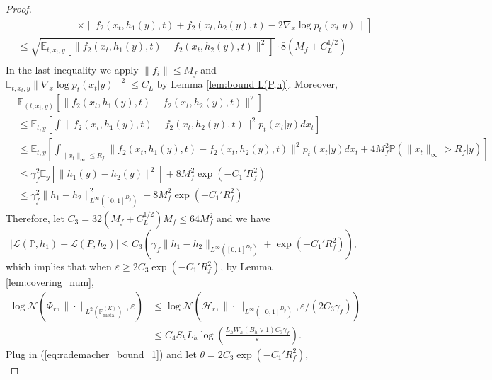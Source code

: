 \documentclass{article}
\numberwithin{equation}{section}
\def\eqref#1{equation~\ref{#1}}
\newcommand{\E}{\mathbb{E}}
\theoremstyle{definition}
\newcommand{\Pmeta}{\mathbb{P}_{\text{meta}}}
\renewcommand{\P}{\mathbb{P}}
\renewcommand{\eqref}[1]{(\ref{#1})}
\begin{document}
\begin{proof}
\begin{equation}
\begin{aligned}
        &\qquad\qquad\qquad  \left.\times\|f_2(x_t,h_1(y),t)+f_2(x_t,h_2(y),t)-2\nabla_x\log p_t(x_t|y)\|\right] \\
        &\leq \sqrt{\E_{t,x_t,y} \left[\|f_2(x_t,h_1(y),t)-f_2(x_t,h_2(y),t)\|^2\right]}\cdot 8(M_f+C_L^{1/2}) \\
        \end{aligned}
    \end{equation}
    In the last inequality we apply $\|f_i\|\leq M_f$ and $\E_{t,x_t,y}\|\nabla_x\log p_t(x_t|y)\|^2\leq C_L$ by Lemma \ref{lem:bound L(P,h)}. 
    Moreover,
    \begin{equation}
        \begin{aligned}
            &\E_{(t,x_t,y)}\left[\|f_2(x_t,h_1(y),t)-f_2(x_t,h_2(y),t)\|^2\right] \\
            &\leq \E_{t,y} \left[\int \|f_2(x_t,h_1(y),t)-f_2(x_t,h_2(y),t)\|^2 p_t(x_t|y)dx_t\right] \\
            &\leq \E_{t,y} \left[\int_{\|x_t\|_\infty\leq R_f} \|f_2(x_t,h_1(y),t)-f_2(x_t,h_2(y),t)\|^2 p_t(x_t|y)dx_t + 4M_f^2\P(\|x_t\|_\infty>R_f|y)\right] \\
            &\leq \gamma_f^2 \E_y[\|h_1(y)-h_2(y)\|^2]+8M_f^2\exp(-C_1'R_f^2) \\
            &\leq \gamma_f^2\|h_1-h_2\|^2_{L^\infty([0,1]^{D_y})}+8M_f^2\exp(-C_1'R_f^2)
        \end{aligned}
    \end{equation}
    Therefore, let $C_3=32(M_f+C_L^{1/2})M_f\leq 64M_f^2$ and we have
    \begin{equation}
        |\mathcal{L}(\P,h_1)-\mathcal{L}(P,h_2)|\leq C_3\left(\gamma_f \|h_1-h_2\|_{L^\infty([0,1]^{D_y})}+\exp(-C_1'R_f^2)\right),
    \end{equation}
    which implies that when $\varepsilon\geq 2C_3\exp(-C_1'R_f^2)$, by Lemma \ref{lem:covering_num},
    \begin{equation}
        \begin{aligned}
            \log\mathcal{N}(\Phi_r,\|\cdot\|_{L^2(\Pmeta^{(K)})},\varepsilon)
            &\leq \log\mathcal{N}(\mathcal{H}_r,\|\cdot\|_{L^\infty([0,1]^{D_y})},\varepsilon/(2C_3\gamma_f))\\
            &\leq C_4S_hL_h\log\left(\frac{L_hW_h(B_h\vee 1)C_3\gamma_f}{\varepsilon}\right).
        \end{aligned}
    \end{equation}
    Plug in \eqref{eq:rademacher_bound_1} and let $\theta=2C_3\exp(-C_1'R_f^2)$,
    \begin{equation}

\end{equation}
\end{proof}
\end{document}
